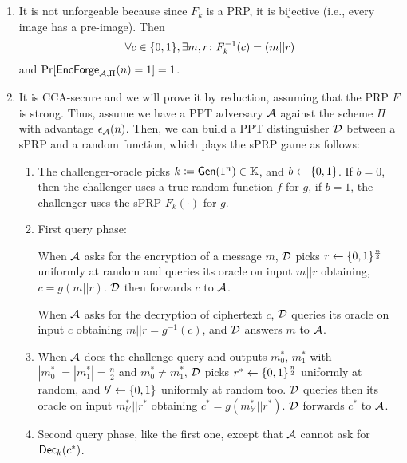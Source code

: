 \begin{solution}
	\begin{enumerate}
		\item It is not unforgeable because since $F_k$ is a PRP, it is bijective (i.e., every image has a pre-image). Then
		\[ \forall c \in \{0, 1\}, \exists m, r \colon F_k^{-1}(c) = (m || r) \]
		and $\Pr[\mathsf{EncForge}_{\mathcal{A}, \Pi}(n)=1] = 1$.

		\item It is CCA-secure and we will prove it by reduction, assuming that the PRP $F$ is strong.
		Thus, assume we have a PPT adversary $\mathcal{A}$ against the scheme $\Pi$ with advantage $\epsilon_{\mathcal{A}}(n)$. Then, we can build a PPT distinguisher $\mathcal{D}$ between a sPRP and a random function, which plays the sPRP game as follows:
		\begin{enumerate}
			\item The challenger-oracle picks $k \coloneqq \operatorname{\mathsf{Gen}}(1^n) \in \mathbb{K}$, and $b \leftarrow \{0, 1\}$. If $b=0$, then the challenger uses a true random function $f$ for $g$, if $b=1$, the challenger uses the sPRP $F_k(\cdot)$ for $g$.
			\item First query phase:

			When $\mathcal{A}$ asks for the encryption of a message $m$, $\mathcal{D}$ picks $r \leftarrow \{0, 1\}^{\frac{n}{2}}$ uniformly at random and queries its oracle on input $m || r$ obtaining, $c = g(m || r)$. $\mathcal{D}$ then forwards $c$ to $\mathcal{A}$.

			When $\mathcal{A}$ asks for the decryption of ciphertext $c$, $\mathcal{D}$ queries its oracle on input $c$ obtaining $m||r=g^{-1}(c)$, and $\mathcal{D}$ answers $m$ to $\mathcal{A}$.

			\item When $\mathcal{A}$ does the challenge query and outputs $m^*_0$, $m^*_1$ with $|m^*_0| = |m^*_1|=\frac{n}{2}$ and $m^*_0 \neq m^*_1$,
			$\mathcal{D}$ picks $r^* \leftarrow \{0, 1\}^{\frac{n}{2}}$ uniformly at random, and $b' \leftarrow \{0, 1\}$ uniformly at random too.
			$\mathcal{D}$ queries then its oracle on input $m^*_{b'} || r^*$ obtaining $c^*=g(m^*_{b'}||r^*)$. $\mathcal{D}$ forwards $c^*$ to $\mathcal{A}$.

			\item Second query phase, like the first one, except that $\mathcal{A}$ cannot ask for $\operatorname{\mathsf{Dec}}_k(c^*)$.


\end{enumerate}
\end{enumerate}
\end{solution}
